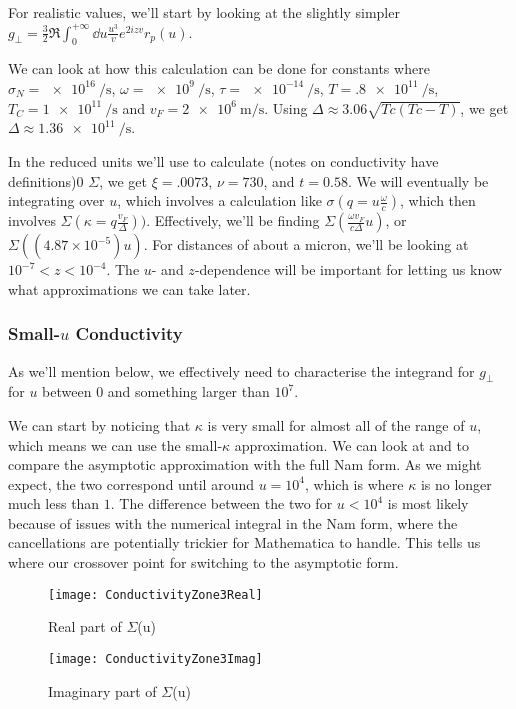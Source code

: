 \documentclass[11pt]{article}
\begin{document}
	For realistic values, we'll start by looking at the slightly simpler $g_\perp = \frac32 \Re \int_0^{+\infty} \dd{u} \frac{u^3}{v} e^{2 i z v} r_p(u)$.

	We can look at how this calculation can be done for constants where $\sigma_N = \SI{e16}{\per\second}$, $\omega = \SI{e9}{\per\second}$, $\tau = \SI{e-14}{\per\second}$, $T = \SI{.8e11}{\per\second}$, $T_C = \SI{1e11}{\per\second}$ and $v_F = \SI{2e6}{\m\per\s}$.
	Using $\Delta \approx 3.06 \sqrt{Tc(Tc - T)}$, we get $\Delta \approx \SI{1.36e11}{\per\second}$.

	In the reduced units we'll use to calculate (notes on conductivity have definitions)0 $\Sigma$, we get $\xi = .0073$, $\nu = 730$, and $t = 0.58$.
	We will eventually be integrating over $u$, which involves a calculation like $\sigma\left(q = u \frac{\omega}{c}\right)$, which then involves $\Sigma\left(\kappa = q \frac{v_F}{\Delta}\right))$.
	Effectively, we'll be finding $\Sigma\left(\frac{\omega v_F}{c \Delta} u\right)$, or $\Sigma\left(\left( 4.87 \times 10^{-5} \right) u \right)$.
	For distances of about a micron, we'll be looking at $10^{-7} < z < 10^{-4}$.
	The $u$- and $z$-dependence will be important for letting us know what approximations we can take later.

	\subsubsection{Small-$u$ Conductivity} \label{subsubsec:smallucond}

	As we'll mention below, we effectively need to characterise the integrand for $g_\perp$ for $u$ between $0$ and something larger than $10^7$.

	We can start by noticing that $\kappa$ is very small for almost all of the range of $u$, which means we can use the small-$\kappa$ approximation.
	We can look at  and  to compare the asymptotic approximation with the full Nam form.
	As we might expect, the two correspond until around $u = 10^4$, which is where $\kappa$ is no longer much less than $1$.
	The difference between the two for $u < 10^4$ is most likely because of issues with the numerical integral in the Nam form, where the cancellations are potentially trickier for Mathematica to handle.
	This tells us where our crossover point for switching to the asymptotic form.

	\begin{figure}[htp]
		\centering
		\texttt{[image: ConductivityZone3Real]}
		\caption{Real part of $\Sigma$(u)} \label{fig:ConductivityRe}
	\end{figure}

	\begin{figure}[htp]
		\centering
		\texttt{[image: ConductivityZone3Imag]}
		\caption{Imaginary part of $\Sigma$(u)} \label{fig:ConductivityIm}
	\end{figure}


	\newpage
	\listoftodos
	\newpage
	\printbibliography
\end{document}
